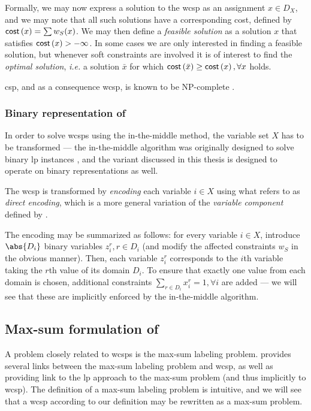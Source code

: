 Formally, we may now express a solution to the \gls{wcsp} as an assignment \({x} \in D_X\), and we may note that all such solutions have a corresponding cost, defined by \(\operatorname{\mathsf{cost}}\left({x}\right) = \sum w_S({x})\).
We may then define a \emph{feasible solution} as a solution \({x}\) that satisfies \(\operatorname{\mathsf{cost}}\left({x}\right) > -\infty\).
In some cases we are only interested in finding a feasible solution, but whenever soft constraints are involved it is of interest to find the \emph{optimal solution}, \emph{i.e.} a solution \(\bar{{x}}\) for which \(\operatorname{\mathsf{cost}}\left(\bar{{x}}\right) \geq \operatorname{\mathsf{cost}}\left({x}\right), \forall {x}\) holds.

\gls{csp}, and as a consequence \gls{wcsp}, is known to be NP-complete \parencite{Mackworth93}.

\subsubsection*{Binary representation of }
\label{term:direct-encoding}
In order to solve \glspl{wcsp} using the in-the-middle method, the variable set \(X\) has to be transformed --- the in-the-middle algorithm was originally designed to solve binary \gls{lp} instances \parencite{Wedelin95}, and the variant discussed in this thesis is designed to operate on binary representations as well.

The \gls{wcsp} is transformed by \emph{encoding} each variable \(i\in X\) using what \textcite[\pno~5]{Allouche14} refers to as \emph{direct encoding}, which is a more general variation of the \emph{variable component} defined by \textcite[\pno~5]{Wedelin08}.

The encoding may be summarized as follows: for every variable \(i\in X\), introduce \(\abs{D_i}\) binary variables \(z_i^r, r\in D_i\) (and modify the affected constraints \(w_S\) in the obvious manner). 
Then, each variable \(z_i^r\) corresponds to the \(i\)th variable taking the \(r\)th value of its domain \(D_i\).
To ensure that exactly one value from each domain is chosen, additional constraints \(\sum_{r\in D_i} x_i^r = 1, \forall i\) are added --- we will see that these are implicitly enforced by the in-the-middle algorithm.

\subsection{Max-sum formulation of }
A problem closely related to \glspl{wcsp} is the max-sum labeling problem.
\Textcite{Werner07} provides several links between the max-sum labeling problem and \gls{wcsp}, as well as providing link to the \gls{lp} approach to the max-sum problem (and thus implicitly to \gls{wcsp}).
The definition of a max-sum labeling problem is intuitive, and we will see that a \gls{wcsp} according to our definition may be rewritten as a max-sum problem.

